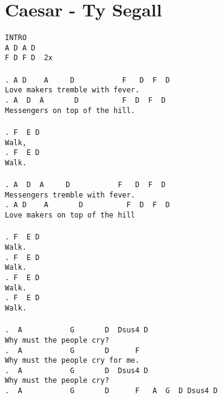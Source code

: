 \newpage
\section{Caesar - Ty Segall}
\label{Caesar - Ty Segall}
\texttt{INTRO\\
A\ D\ A\ D\\
F\ D\ F\ D\ \ 2x\\
\\
. A\ D\ \ \ \ A\ \ \ \ \ D\ \ \ \ \ \ \ \ \ \ \ F\ \ \ D\ \ F\ \ D\\
Love\ makers\ tremble\ with\ fever.\\
. A\ \ D\ \ A\ \ \ \ \ \ \ D\ \ \ \ \ \ \ \ \ \ F\ \ D\ \ F\ \ D\ \\
Messengers\ on\ top\ of\ the\ hill.\\
\\
. F\ \ E\ D\\
Walk,\\
. F\ \ E\ D\\
Walk.\\
\\
. A\ \ D\ \ A\ \ \ \ \ D\ \ \ \ \ \ \ \ \ \ \ F\ \ \ D\ \ F\ \ D\\
Messengers\ tremble\ with\ fever.\\
. A\ D\ \ \ \ A\ \ \ \ \ \ \ D\ \ \ \ \ \ \ \ \ \ F\ \ D\ \ F\ \ D\\
Love\ makers\ on\ top\ of\ the\ hill\ \\
\\
. F\ \ E\ D\\
Walk.\\
. F\ \ E\ D\\
Walk.\\
. F\ \ E\ D\\
Walk.\\
. F\ \ E\ D\\
Walk.\\
\\
. \ A\ \ \ \ \ \ \ \ \ \ \ G\ \ \ \ \ \ \ D\ \ Dsus4\ D\\
Why\ must\ the\ people\ cry?\ \\
. \ A\ \ \ \ \ \ \ \ \ \ \ G\ \ \ \ \ \ \ D\ \ \ \ \ \ F\\
Why\ must\ the\ people\ cry\ for\ me.\\
. \ A\ \ \ \ \ \ \ \ \ \ \ G\ \ \ \ \ \ \ D\ \ Dsus4\ D\\
Why\ must\ the\ people\ cry?\ \\
. \ A\ \ \ \ \ \ \ \ \ \ \ G\ \ \ \ \ \ \ D\ \ \ \ \ \ F\ \ \ A\ \ G\ \ D\ Dsus4\ D\\
}
